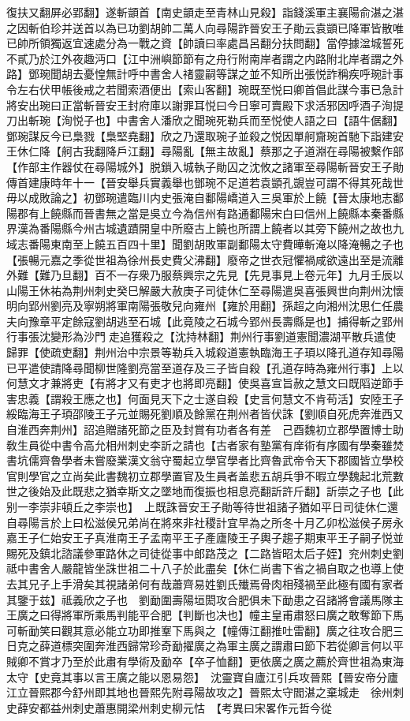 復扶又翻屏必郢翻】遂斬顗首【南史顗走至青林山見殺】詣錢溪軍主襄陽俞湛之湛之因斬伯珍并送首以為已功劉胡帥二萬人向尋陽詐晉安王子勛云袁顗已降軍皆散唯已帥所領獨返宜速處分為一戰之資【帥讀曰率處昌呂翻分扶問翻】當停據湓城誓死不貳乃於江外夜趣沔口【江中洲嶼節節有之舟行附南岸者謂之内路附北岸者謂之外路】鄧琬聞胡去憂惶無計呼中書舍人禇靈嗣等謀之並不知所出張悦詐稱疾呼琬計事令左右伏甲帳後戒之若聞索酒便出【索山客翻】琬既至悦曰卿首倡此謀今事已急計將安出琬曰正當斬晉安王封府庫以謝罪耳悦曰今日寧可賣殿下求活邪因呼酒子洵提刀出斬琬【洵悦子也】中書舍人潘欣之聞琬死勒兵而至悦使人語之曰【語牛倨翻】鄧琬謀反今已梟戮【梟堅堯翻】欣之乃還取琬子並殺之悦因單舸齎琬首馳下詣建安王休仁降【舸古我翻降戶江翻】尋陽亂【無主故亂】蔡那之子道淵在尋陽被繫作部【作部主作器仗在尋陽城外】脱鎻入城執子勛囚之沈攸之諸軍至尋陽斬晉安王子勛傳首建康時年十一【晉安舉兵實義舉也鄧琬不足道若袁顗孔覬豈可謂不得其死哉世毋以成敗論之】初鄧琬遣臨川内史張淹自鄱陽嶠道入三吳軍於上饒【晉太康地志鄱陽郡有上饒縣而晉書無之當是吳立今為信州有路通鄱陽宋白曰信州上饒縣本秦番縣界漢為番陽縣今州古城遺蹟開皇中所廢古上饒也所謂上饒者以其旁下饒州之故也九域志番陽東南至上饒五百四十里】聞劉胡敗軍副鄱陽太守費曄斬淹以降淹暢之子也【張暢元嘉之季從世祖為徐州長史費父沸翻】廢帝之世衣冠懼禍咸欲遠出至是流離外難【難乃旦翻】百不一存衆乃服蔡興宗之先見【先見事見上卷元年】九月壬辰以山陽王休祐為荆州刺史癸巳解嚴大赦庚子司徒休仁至尋陽遣吳喜張興世向荆州沈懷明向郢州劉亮及寧朔將軍南陽張敬兒向雍州【雍於用翻】孫超之向湘州沈思仁任農夫向豫章平定餘寇劉胡逃至石城【此竟陵之石城今郢州長壽縣是也】捕得斬之郢州行事張沈變形為沙門走追獲殺之【沈持林翻】荆州行事劉道憲聞濃湖平散兵遣使歸罪【使疏吏翻】荆州治中宗景等勒兵入城殺道憲執臨海王子頊以降孔道存知尋陽已平遣使請降尋聞柳世隆劉亮當至道存及三子皆自殺【孔道存時為雍州行事】上以何慧文才兼將吏【有將才又有吏才也將即亮翻】使吳喜宣旨赦之慧文曰既䧟逆節手害忠義【謂殺王應之也】何面見天下之士遂自殺【史言何慧文不肯苟活】安陸王子綏臨海王子頊邵陵王子元並賜死劉順及餘黨在荆州者皆伏誅【劉順自死虎奔淮西又自淮西奔荆州】詔追贈諸死節之臣及封賞有功者各有差　己酉魏初立郡學置博士助敎生員從中書令高允相州刺史李訢之請也【古者家有塾黨有庠術有序國有學秦雖焚書坑儒齊魯學者未嘗廢業漢文翁守蜀起立學官學者比齊魯武帝令天下郡國皆立學校官則學官之立尚矣此書魏初立郡學置官及生員者盖悲五胡兵爭不暇立學魏起北荒數世之後始及此既悲之猶幸斯文之墜地而復振也相息亮翻訢許斤翻】訢崇之子也【此别一李崇非頓丘之李崇也】　上既誅晉安王子勛等待世祖諸子猶如平日司徒休仁還自尋陽言於上曰松滋侯兄弟尚在將來非社稷計宜早為之所冬十月乙卯松滋侯子房永嘉王子仁始安王子真淮南王子孟南平王子產廬陵王子輿子趨子期東平王子嗣子悦並賜死及鎮北諮議參軍路休之司徒從事中郎路茂之【二路皆昭太后子姪】兖州刺史劉祗中書舍人嚴龍皆坐誅世祖二十八子於此盡矣【休仁尚書下省之禍自取之也導上使去其兄子上手滑矣其視諸弟何有哉蕭齊易姓劉氏殱焉骨肉相殘禍至此極有國有家者其鑒于兹】祗義欣之子也　劉勔圍壽陽垣閎攻合肥俱未下勔患之召諸將會議馬隊主王廣之曰得將軍所乘馬判能平合肥【判斷也决也】幢主皇甫肅怒曰廣之敢奪節下馬可斬勔笑曰觀其意必能立功即推鞌下馬與之【幢傳江翻推吐雷翻】廣之往攻合肥三日克之薛道標突圍奔淮西歸常珍奇勔擢廣之為軍主廣之謂肅曰節下若從卿言何以平賊卿不賞才乃至於此肅有學術及勔卒【卒子恤翻】更依廣之廣之薦於齊世祖為東海太守【史竟其事以言王廣之能以恩易怨】　沈靈寶自廬江引兵攻晉熙【晉安帝分廬江立晉熙郡今舒州即其地也晉熙先附尋陽故攻之】晉熙太守閻湛之棄城走　徐州刺史薛安都益州刺史蕭惠開梁州刺史柳元怙　【考異曰宋畧作元哲今從